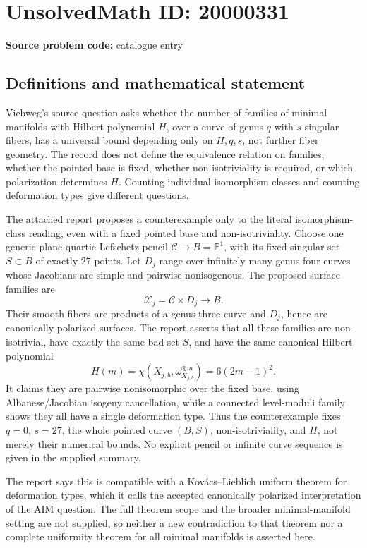 \documentclass[11pt]{article}
\newcommand{\PP}{\mathbb{P}}
\begin{document}
\section*{UnsolvedMath ID: 20000331}
\textbf{Source problem code:} catalogue entry
\subsection{Definitions and mathematical statement}
Viehweg's source question asks whether the number of families of minimal manifolds with Hilbert polynomial \(H\), over a curve of genus \(q\) with \(s\) singular fibers, has a universal bound depending only on \(H,q,s\), not further fiber geometry. The record does not define the equivalence relation on families, whether the pointed base is fixed, whether non-isotriviality is required, or which polarization determines \(H\). Counting individual isomorphism classes and counting deformation types give different questions.

The attached report proposes a counterexample only to the literal isomorphism-class reading, even with a fixed pointed base and non-isotriviality. Choose one generic plane-quartic Lefschetz pencil \(\mathcal C\to B=\PP^1\), with its fixed singular set \(S\subset B\) of exactly \(27\) points. Let \(D_j\) range over infinitely many genus-four curves whose Jacobians are simple and pairwise nonisogenous. The proposed surface families are
\[
\mathcal X_j=\mathcal C\times D_j\longrightarrow B.
\]
Their smooth fibers are products of a genus-three curve and \(D_j\), hence are canonically polarized surfaces. The report asserts that all these families are non-isotrivial, have exactly the same bad set \(S\), and have the same canonical Hilbert polynomial
\[
H(m)=\chi(X_{j,b},\omega_{X_{j,b}}^{\otimes m})=6(2m-1)^2.
\]
It claims they are pairwise nonisomorphic over the fixed base, using Albanese/Jacobian isogeny cancellation, while a connected level-moduli family shows they all have a single deformation type. Thus the counterexample fixes \(q=0\), \(s=27\), the whole pointed curve \((B,S)\), non-isotriviality, and \(H\), not merely their numerical bounds. No explicit pencil or infinite curve sequence is given in the supplied summary.

The report says this is compatible with a Kov\'acs--Lieblich uniform theorem for deformation types, which it calls the accepted canonically polarized interpretation of the AIM question. The full theorem scope and the broader minimal-manifold setting are not supplied, so neither a new contradiction to that theorem nor a complete uniformity theorem for all minimal manifolds is asserted here.
\end{document}

